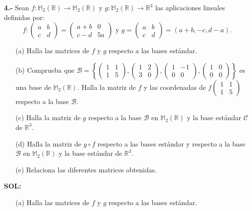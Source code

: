 \documentclass[11pt,a4paper]{article}
\newcommand{\R}{\mathbb R}
\begin{document}
{\bf 4.-} Sean $f:\mathbb M_2(\R)\to \mathbb M_2(\R)$ y $g:\mathbb M_2(\R)\to \R^3$ las aplicaciones lineales definidas por:
\[
f:\begin{pmatrix}
a&b\\c&d
\end{pmatrix}=\begin{pmatrix}
a+b&0\\c-d&5a
\end{pmatrix}
\text{ y }
g=\begin{pmatrix}
a&b\\c&d
\end{pmatrix}=(a+b,-c,d-a).
\]
\begin{itemize}
\item[(a)] Halla las matrices de $f$ y $g$ respecto a las bases estándar.
\item[(b)] Comprueba que $\mathcal B=\left\{\begin{pmatrix}1&1\\1&5\end{pmatrix}, \begin{pmatrix}1&2\\3&0\end{pmatrix}, \begin{pmatrix}1&-1\\0&0\end{pmatrix}, \begin{pmatrix}1&0\\0&0\end{pmatrix}\right\}$ es una base de $\mathbb M_2(\R)$. Halla la matriz de $f$ y las coordenadas de $f\begin{pmatrix}1&1\\1&5\end{pmatrix}$ respecto a la base $\mathcal B$.
\item[(c)] Halla la matriz de $g$ respecto a la base $\mathcal B$ en $\mathbb M_2(\R)$ y la base estándar $\mathcal C$ de $\R^3$.
\item[(d)] Halla la matriz de $g\circ f$ respecto a las bases estándar y respecto a la base $\mathcal B$ en $\mathbb M_2(\R)$ y la base estándar de $\R^3$.
\item[(e)] Relaciona las diferentes matrices obtenidas.
\end{itemize}
\vskip 1mm
{\bf SOL:}
\begin{itemize}\item[(a)] Halla las matrices de $f$ y $g$ respecto a las bases estándar.\end{itemize}
\end{document}
